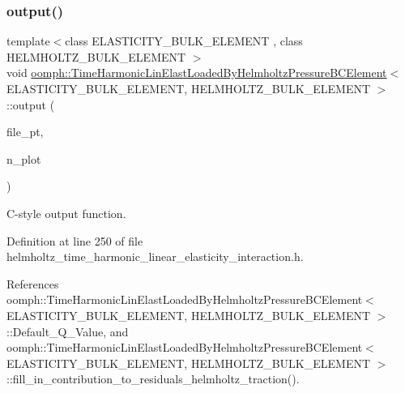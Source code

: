 \subsubsection{\texorpdfstring{output()}{output()}\hspace{0.1cm}{\footnotesize\ttfamily [4/4]}}
{\footnotesize\ttfamily template$<$class E\+L\+A\+S\+T\+I\+C\+I\+T\+Y\+\_\+\+B\+U\+L\+K\+\_\+\+E\+L\+E\+M\+E\+NT , class H\+E\+L\+M\+H\+O\+L\+T\+Z\+\_\+\+B\+U\+L\+K\+\_\+\+E\+L\+E\+M\+E\+NT $>$ \\
void \hyperlink{classoomph_1_1TimeHarmonicLinElastLoadedByHelmholtzPressureBCElement}{oomph\+::\+Time\+Harmonic\+Lin\+Elast\+Loaded\+By\+Helmholtz\+Pressure\+B\+C\+Element}$<$ E\+L\+A\+S\+T\+I\+C\+I\+T\+Y\+\_\+\+B\+U\+L\+K\+\_\+\+E\+L\+E\+M\+E\+NT, H\+E\+L\+M\+H\+O\+L\+T\+Z\+\_\+\+B\+U\+L\+K\+\_\+\+E\+L\+E\+M\+E\+NT $>$\+::output (\begin{DoxyParamCaption}\item[{F\+I\+LE $\ast$}]{file\+\_\+pt,  }\item[{const unsigned \&}]{n\+\_\+plot }\end{DoxyParamCaption})\hspace{0.3cm}{\ttfamily [inline]}}



C-\/style output function. 



Definition at line 250 of file helmholtz\+\_\+time\+\_\+harmonic\+\_\+linear\+\_\+elasticity\+\_\+interaction.\+h.



References oomph\+::\+Time\+Harmonic\+Lin\+Elast\+Loaded\+By\+Helmholtz\+Pressure\+B\+C\+Element$<$ E\+L\+A\+S\+T\+I\+C\+I\+T\+Y\+\_\+\+B\+U\+L\+K\+\_\+\+E\+L\+E\+M\+E\+N\+T, H\+E\+L\+M\+H\+O\+L\+T\+Z\+\_\+\+B\+U\+L\+K\+\_\+\+E\+L\+E\+M\+E\+N\+T $>$\+::\+Default\+\_\+\+Q\+\_\+\+Value, and oomph\+::\+Time\+Harmonic\+Lin\+Elast\+Loaded\+By\+Helmholtz\+Pressure\+B\+C\+Element$<$ E\+L\+A\+S\+T\+I\+C\+I\+T\+Y\+\_\+\+B\+U\+L\+K\+\_\+\+E\+L\+E\+M\+E\+N\+T, H\+E\+L\+M\+H\+O\+L\+T\+Z\+\_\+\+B\+U\+L\+K\+\_\+\+E\+L\+E\+M\+E\+N\+T $>$\+::fill\+\_\+in\+\_\+contribution\+\_\+to\+\_\+residuals\+\_\+helmholtz\+\_\+traction().

\mbox{\label{classoomph_1_1TimeHarmonicLinElastLoadedByHelmholtzPressureBCElement_af8f267ad94739fefd852796732eea1bd}} 
